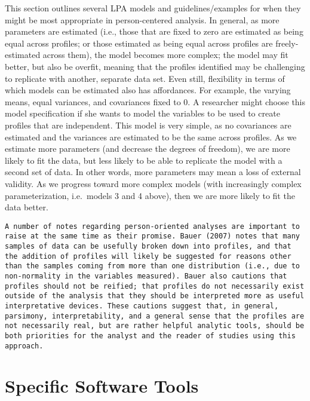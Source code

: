 \documentclass[man]{apa6}
\begin{document}
This section outlines several LPA models and guidelines/examples for
when they might be most appropriate in person-centered analysis. In
general, as more parameters are estimated (i.e., those that are fixed to
zero are estimated as being equal across profiles; or those estimated as
being equal across profiles are freely-estimated across them), the model
becomes more complex; the model may fit better, but also be overfit,
meaning that the profiles identified may be challenging to replicate
with another, separate data set. Even still, flexibility in terms of
which models can be estimated also has affordances. For example, the
varying means, equal variances, and covariances fixed to 0. A researcher
might choose this model specification if she wants to model the
variables to be used to create profiles that are independent. This model
is very simple, as no covariances are estimated and the variances are
estimated to be the same across profiles. As we estimate more parameters
(and decrease the degrees of freedom), we are more likely to fit the
data, but less likely to be able to replicate the model with a second
set of data. In other words, more parameters may mean a loss of external
validity. As we progress toward more complex models (with increasingly
complex parameterization, i.e.~models 3 and 4 above), then we are more
likely to fit the data better.

\begin{verbatim}
A number of notes regarding person-oriented analyses are important to raise at the same time as their promise. Bauer (2007) notes that many samples of data can be usefully broken down into profiles, and that the addition of profiles will likely be suggested for reasons other than the samples coming from more than one distribution (i.e., due to non-normality in the variables measured). Bauer also cautions that profiles should not be reified; that profiles do not necessarily exist outside of the analysis that they should be interpreted more as useful interpretative devices. These cautions suggest that, in general, parsimony, interpretability, and a general sense that the profiles are not necessarily real, but are rather helpful analytic tools, should be both priorities for the analyst and the reader of studies using this approach.
\end{verbatim}

\section{Specific Software Tools}\label{specific-software-tools}
\end{document}

